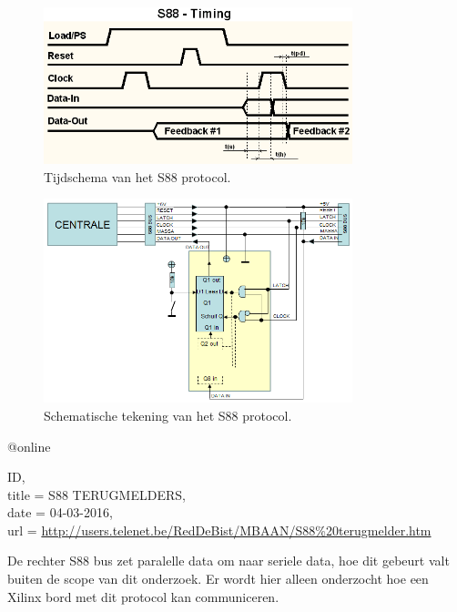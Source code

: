 \begin{figure}[h]
	\begin{center}
		\includegraphics[width=0.8\textwidth]{./img/S88Timing.png}
		\caption{Tijdschema van het S88 protocol.}

	\end{center}
\end{figure}
\begin{figure}[h]
	\begin{center}
		\includegraphics[width=0.8\textwidth]{./img/S88Bus.png}
		\caption{Schematische tekening van het S88 protocol.}

	\end{center}
\end{figure}


@online{ID,\\
	title = {S88 TERUGMELDERS},\\
	date = {04-03-2016},\\
	url = \url{http://users.telenet.be/RedDeBist/MBAAN/S88\%20terugmelder.htm}
		
	}
	
De rechter S88 bus zet paralelle data om naar seriele data, hoe dit gebeurt valt buiten de scope van dit onderzoek. Er wordt hier alleen onderzocht hoe een Xilinx bord met dit protocol kan communiceren.
\clearpage
	
